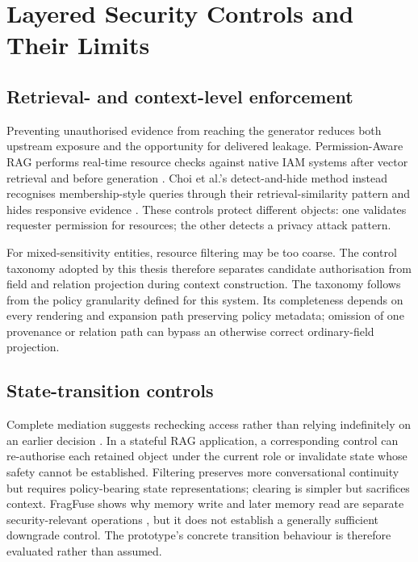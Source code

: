 \section{Layered Security Controls and Their Limits}
\label{sec:background-controls}

\subsection{Retrieval- and context-level enforcement}

Preventing unauthorised evidence from reaching the generator reduces both upstream exposure and the opportunity for delivered leakage. Permission-Aware RAG performs real-time resource checks against native IAM systems after vector retrieval and before generation \citep{jeong2025permissionrag}. Choi et al.'s detect-and-hide method instead recognises membership-style queries through their retrieval-similarity pattern and hides responsive evidence \citep{choi2025safeguarding}. These controls protect different objects: one validates requester permission for resources; the other detects a privacy attack pattern.

For mixed-sensitivity entities, resource filtering may be too coarse. The control taxonomy adopted by this thesis therefore separates candidate authorisation from field and relation projection during context construction. The taxonomy follows from the policy granularity defined for this system. Its completeness depends on every rendering and expansion path preserving policy metadata; omission of one provenance or relation path can bypass an otherwise correct ordinary-field projection.

\subsection{State-transition controls}

Complete mediation suggests rechecking access rather than relying indefinitely on an earlier decision \citep{saltzer1975protection}. In a stateful RAG application, a corresponding control can re-authorise each retained object under the current role or invalidate state whose safety cannot be established. Filtering preserves more conversational continuity but requires policy-bearing state representations; clearing is simpler but sacrifices context. FragFuse shows why memory write and later memory read are separate security-relevant operations \citep{rao2026fragfuse}, but it does not establish a generally sufficient downgrade control. The prototype's concrete transition behaviour is therefore evaluated rather than assumed.

